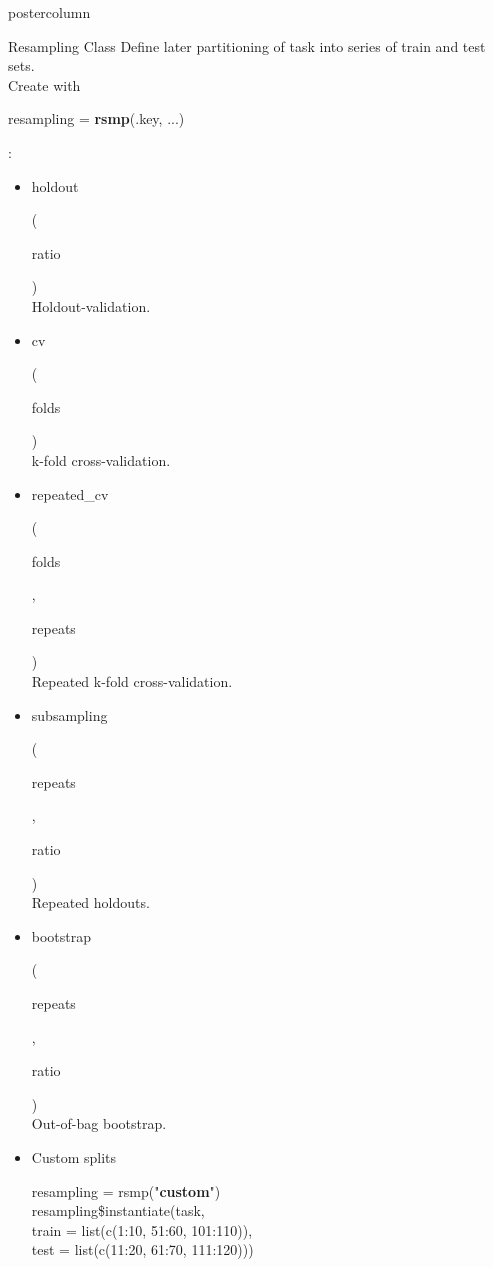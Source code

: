 \documentclass{beamer}
\newlength{\columnheight} %
\newcommand{\codeinline}[1]{\begin{codeboxinline}#1\end{codeboxinline}}
\begin{document}
\begin{withoutheader}
\begin{frame}[fragile]{}
	\begin{columns}
		\begin{column}{.245\textwidth}
			\begin{beamercolorbox}[center]{postercolumn}
				\begin{minipage}{.98\textwidth}
					\parbox[t][\columnheight]{\textwidth}{
						\begin{myblock}{Resampling Class}
							Define later partitioning of task into series of train and test sets. \\ 
							Create with \codeinline{resampling = \textbf{rsmp}(.key, ...)}:
							\\
							\begin{itemize}
                                \item \codeinline{holdout}
                                (\codeinline{ratio})\\
                                Holdout-validation.
								\item \codeinline{cv}
								(\codeinline{folds})\\
								k-fold cross-validation.
								\item \codeinline{repeated\_cv}
								(\codeinline{folds}, \codeinline{repeats})\\
								Repeated k-fold cross-validation.
								\item \codeinline{subsampling}
								(\codeinline{repeats}, \codeinline{ratio})\\
								Repeated holdouts.
								\item \codeinline{bootstrap}
								(\codeinline{repeats}, \codeinline{ratio})\\
								Out-of-bag bootstrap.
								\item Custom splits \\
							\begin{codeboxmultiline}[width=26cm]
							resampling = rsmp("\textbf{custom}")\\
							resampling\$instantiate(task,\\
							\hspace*{1ex} train = list(c(1:10, 51:60, 101:110)),\\
							\hspace*{1ex} test = list(c(11:20, 61:70, 111:120)))
							\end{codeboxmultiline}
							\end{itemize}

\end{myblock}}
\end{minipage}
\end{beamercolorbox}
\end{column}
\end{columns}
\end{frame}
\end{withoutheader}
\end{document}
